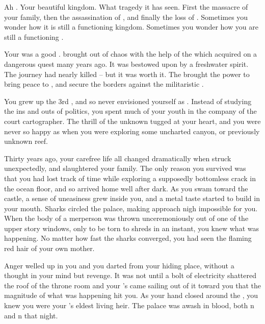 \documentclass[char]{NeptuneBall}
\begin{document}
\name{\cKing{}}

Ah \pAtlantis{}. Your beautiful kingdom. What tragedy it has seen. First the massacre of your family, then the assassination of \cQueen{\King{}} \cQueen{}, and finally the loss of \cAriel{\Prince{}} \cAriel{}. Sometimes you wonder how it is still a functioning kingdom. Sometimes you wonder how you are still a functioning \cKing{\King{}}.

Your \cExKing{\parent{}} was a good \cExKing{\King{}}. \cExKing{\They{}} brought \pAtlantis{} out of chaos with the help of the \iTriton{\MYname{}} which \cExKing{\they{}} acquired on a dangerous quest many years ago. It was bestowed upon \cExKing{\them{}} by a freshwater spirit. The journey had nearly killed \cExKing{\them{}} -- but it was worth it. The \iTriton{\MYname{}} brought \cExKing{\MYname{}} the power to bring peace to \pAtlantis{}, and secure the borders against the militaristic \pPacifica{}.

You grew up the 3rd \cKing{\offspring{}}, and so never envisioned yourself as \cKing{\King{}}. Instead of studying the ins and outs of politics, you spent much of your youth in the company of the court cartographer. The thrill of the unknown tugged at your heart, and you were never so happy as when you were exploring some uncharted canyon, or previously unknown reef.

Thirty years ago, your carefree life all changed dramatically when \pPacifica{} struck unexpectedly, and slaughtered your family. The only reason you survived was that you had lost track of time while exploring a supposedly bottomless crack in the ocean floor, and so arrived home well after dark. As you swam toward the castle, a sense of uneasiness grew inside you, and a metal taste started to build in your mouth. Sharks circled the palace, making approach nigh impossible for you. When the body of a merperson was thrown unceremoniously out of one of the upper story windows, only to be torn to shreds in an instant, you knew what was happening. No matter how fast the sharks converged, you had seen the flaming red hair of your own mother.

Anger welled up in you and you darted from your hiding place, without a thought in your mind but revenge. It was not until a bolt of electricity shattered the roof of the throne room and your \cExKing{\parent{}}'s \iTriton{\MYname{}} came sailing out of it toward you that the magnitude of what was happening hit you. As your hand closed around the \iTriton{\MYname{}}, you knew you were your \cExKing{\parent{}}'s eldest living heir. The palace was awash in blood, both \pPacifica{}n and \pAtlantis{}n that night. 
\end{document}
